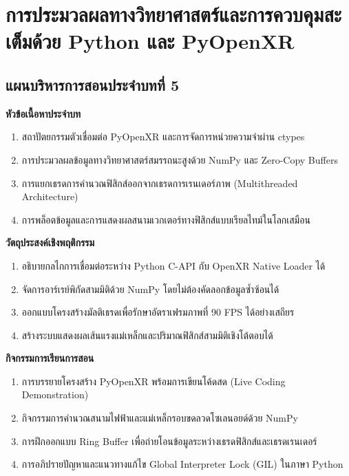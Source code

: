 \chapter{การประมวลผลทางวิทยาศาสตร์และการควบคุมสะเต็มด้วย Python และ PyOpenXR}
\label{chap:ch05}

\section*{แผนบริหารการสอนประจำบทที่ 5}

\noindent\textbf{หัวข้อเนื้อหาประจำบท}
\begin{enumerate}
    \item สถาปัตยกรรมตัวเชื่อมต่อ PyOpenXR และการจัดการหน่วยความจำผ่าน ctypes
    \item การประมวลผลข้อมูลทางวิทยาศาสตร์สมรรถนะสูงด้วย NumPy และ Zero-Copy Buffers
    \item การแยกเธรดการคำนวณฟิสิกส์ออกจากเธรดการเรนเดอร์ภาพ (Multithreaded Architecture)
    \item การพล็อตข้อมูลและการแสดงผลสนามเวกเตอร์ทางฟิสิกส์แบบเรียลไทม์ในโลกเสมือน
\end{enumerate}

\noindent\textbf{วัตถุประสงค์เชิงพฤติกรรม}
\begin{enumerate}
    \item อธิบายกลไกการเชื่อมต่อระหว่าง Python C-API กับ OpenXR Native Loader ได้
    \item จัดการอาร์เรย์พิกัดสามมิติด้วย NumPy โดยไม่ต้องคัดลอกข้อมูลซ้ำซ้อนได้
    \item ออกแบบโครงสร้างมัลติเธรดเพื่อรักษาอัตราเฟรมภาพที่ 90 FPS ได้อย่างเสถียร
    \item สร้างระบบแสดงผลเส้นแรงแม่เหล็กและปริมาณฟิสิกส์สามมิติเชิงโต้ตอบได้
\end{enumerate}

\newpage

\noindent\textbf{กิจกรรมการเรียนการสอน}
\begin{enumerate}
    \item การบรรยายโครงสร้าง PyOpenXR พร้อมการเขียนโค้ดสด (Live Coding Demonstration)
    \item กิจกรรมการคำนวณสนามไฟฟ้าและแม่เหล็กรอบขดลวดโซเลนอยด์ด้วย NumPy
    \item การฝึกออกแบบ Ring Buffer เพื่อถ่ายโอนข้อมูลระหว่างเธรดฟิสิกส์และเธรดเรนเดอร์
    \item การอภิปรายปัญหาและแนวทางแก้ไข Global Interpreter Lock (GIL) ในภาษา Python
\end{enumerate}

